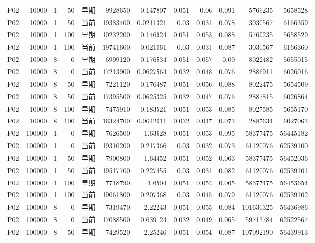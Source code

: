 \documentclass[UTF8,a4paper,10pt,twocolumn,fontset=fandol]{ctexart}
\begin{document}
\begin{longtable}{@{}lrrrlrrrrrrr@{}}
P02 & 10000 & 1 & 50 & 早期 & 9928650 & 0.147807 & 0.051 & 0.06 & 0.091 & 5769235 & 5658528 \\
P02 & 10000 & 1 & 50 & 当前 & 19383400 & 0.0211321 & 0.03 & 0.031 & 0.078 & 3030567 & 6166359 \\
P02 & 10000 & 1 & 100 & 早期 & 10232200 & 0.146924 & 0.051 & 0.053 & 0.088 & 5769235 & 5658529 \\
P02 & 10000 & 1 & 100 & 当前 & 19741600 & 0.021061 & 0.03 & 0.031 & 0.087 & 3030567 & 6166360 \\
P02 & 10000 & 8 & 0 & 早期 & 6999120 & 0.176534 & 0.051 & 0.057 & 0.09 & 8022482 & 5655015 \\
P02 & 10000 & 8 & 0 & 当前 & 17213900 & 0.0627564 & 0.032 & 0.048 & 0.076 & 2886911 & 6026016 \\
P02 & 10000 & 8 & 50 & 早期 & 7221120 & 0.176487 & 0.051 & 0.056 & 0.088 & 8022475 & 5654509 \\
P02 & 10000 & 8 & 50 & 当前 & 17395500 & 0.0625325 & 0.032 & 0.047 & 0.076 & 2887815 & 6026864 \\
P02 & 10000 & 8 & 100 & 早期 & 7475910 & 0.183521 & 0.051 & 0.053 & 0.085 & 8027585 & 5655170 \\
P02 & 10000 & 8 & 100 & 当前 & 16324700 & 0.0642011 & 0.032 & 0.047 & 0.073 & 2887634 & 6027063 \\
P02 & 100000 & 1 & 0 & 早期 & 7626500 & 1.63628 & 0.051 & 0.053 & 0.095 & 58377475 & 56445182 \\
P02 & 100000 & 1 & 0 & 当前 & 19310200 & 0.217366 & 0.03 & 0.032 & 0.073 & 61120076 & 62539100 \\
P02 & 100000 & 1 & 50 & 早期 & 7900800 & 1.64452 & 0.051 & 0.052 & 0.063 & 58377475 & 56452036 \\
P02 & 100000 & 1 & 50 & 当前 & 19517700 & 0.227455 & 0.03 & 0.031 & 0.082 & 61120076 & 62539101 \\
P02 & 100000 & 1 & 100 & 早期 & 7718790 & 1.6504 & 0.051 & 0.052 & 0.065 & 58377475 & 56453654 \\
P02 & 100000 & 1 & 100 & 当前 & 19061800 & 0.207368 & 0.03 & 0.045 & 0.079 & 61120076 & 62539102 \\
P02 & 100000 & 8 & 0 & 早期 & 7319470 & 2.22243 & 0.051 & 0.055 & 0.084 & 101630325 & 56436986 \\
P02 & 100000 & 8 & 0 & 当前 & 17088500 & 0.639124 & 0.032 & 0.049 & 0.065 & 59713784 & 62522567 \\
P02 & 100000 & 8 & 50 & 早期 & 7429520 & 2.25246 & 0.051 & 0.054 & 0.087 & 107092190 & 56439913 \\

\end{longtable}
\end{document}
